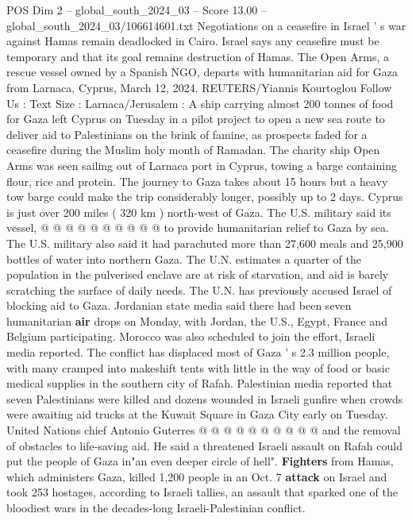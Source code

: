 \begin{textsample}{POS Dim 2 – global\_south\_2024\_03 – Score 13.00 – global\_south\_2024\_03/106614601.txt}  \label{ex:f2_pos_338}
Negotiations on a ceasefire in Israel ' s war against Hamas remain deadlocked in Cairo.
Israel says any ceasefire must be temporary and that its goal remains destruction of Hamas.
The Open Arms, a rescue vessel owned by a Spanish NGO, departs with humanitarian aid for Gaza from Larnaca, Cyprus, March 12, 2024.
REUTERS/Yiannis Kourtoglou Follow Us : Text Size : Larnaca/Jerusalem : A ship carrying almost 200 tonnes of food for Gaza left Cyprus on Tuesday in a pilot project to open a new sea route to deliver aid to Palestinians on the brink of famine, as prospects faded for a ceasefire during the Muslim holy month of Ramadan.
The charity ship Open Arms was seen sailing out of Larnaca port in Cyprus, towing a barge containing flour, rice and protein.
The journey to Gaza takes about 15 hours but a heavy tow barge could make the trip considerably longer, possibly up to 2 days.
Cyprus is just over 200 miles ( 320 km ) north-west of Gaza.
The U.S. military said its vessel, @ @ @ @ @ @ @ @ @ @ to provide humanitarian relief to Gaza by sea.
The U.S. military also said it had parachuted more than 27,600 meals and 25,900 bottles of water into northern Gaza.
The U.N. estimates a quarter of the population in the pulverised enclave are at risk of starvation, and aid is barely scratching the surface of daily needs.
The U.N. has previously accused Israel of blocking aid to Gaza.
Jordanian state media said there had been seven humanitarian \textbf{air} drops on Monday, with Jordan, the U.S., Egypt, France and Belgium participating.
Morocco was also scheduled to join the effort, Israeli media reported.
The conflict has displaced most of Gaza ' s 2.3 million people, with many cramped into makeshift tents with little in the way of food or basic medical supplies in the southern city of Rafah.
Palestinian media reported that seven Palestinians were killed and dozens wounded in Israeli gunfire when crowds were awaiting aid trucks at the Kuwait Square in Gaza City early on Tuesday.
United Nations chief Antonio Guterres @ @ @ @ @ @ @ @ @ @ and the removal of obstacles to life-saving aid.
He said a threatened Israeli assault on Rafah could put the people of Gaza in"an even deeper circle of hell". \textbf{Fighters} from Hamas, which administers Gaza, killed 1,200 people in an Oct. 7 \textbf{attack} on Israel and took 253 hostages, according to Israeli tallies, an assault that sparked one of the bloodiest wars in the decades-long Israeli-Palestinian conflict.

\end{textsample}
